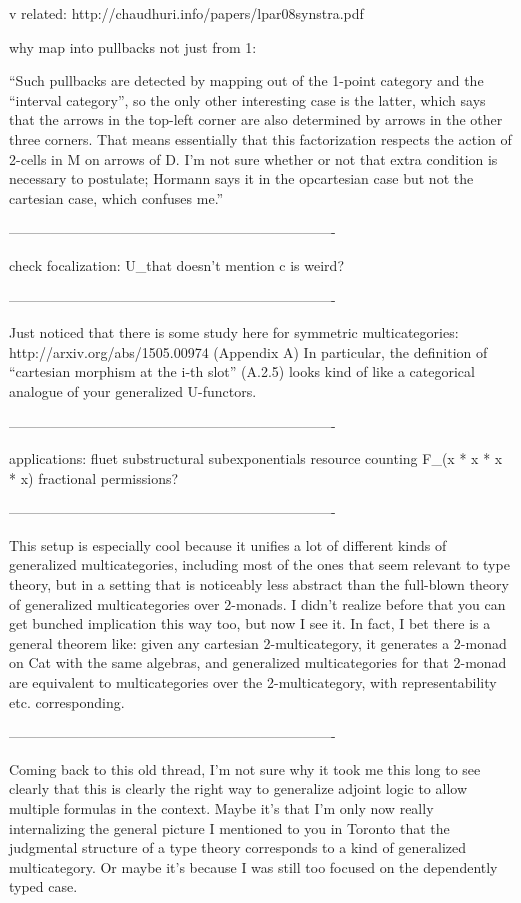 
v related: http://chaudhuri.info/papers/lpar08synstra.pdf

why map into pullbacks not just from 1:

``Such pullbacks are detected by mapping out of the 1-point category and
the ``interval category'', so the only other interesting case is the
latter, which says that the arrows in the top-left corner are also
determined by arrows in the other three corners.  That means essentially
that this factorization respects the action of 2-cells in M on arrows of
D.  I'm not sure whether or not that extra condition is necessary to
postulate; Hormann says it in the opcartesian case but not the cartesian
case, which confuses me.''

----------------------------------------------------------------------

check focalization: U_\alpha that doesn't mention c is weird?

----------------------------------------------------------------------

Just noticed that there is some study here for symmetric
multicategories: http://arxiv.org/abs/1505.00974 (Appendix A) In
particular, the definition of ``cartesian morphism at the i-th slot''
(A.2.5) looks kind of like a categorical analogue of your generalized
U-functors.

----------------------------------------------------------------------

applications:
fluet substructural
subexponentials
resource counting F_(x * x * x * x)
fractional permissions?

----------------------------------------------------------------------

This setup is especially cool because it unifies a lot of different
kinds of generalized multicategories, including most of the ones that
seem relevant to type theory, but in a setting that is noticeably less
abstract than the full-blown theory of generalized multicategories
over 2-monads.  I didn't realize before that you can get bunched
implication this way too, but now I see it.  In fact, I bet there is a
general theorem like: given any cartesian 2-multicategory, it
generates a 2-monad on Cat with the same algebras, and generalized
multicategories for that 2-monad are equivalent to multicategories
over the 2-multicategory, with representability etc. corresponding.

----------------------------------------------------------------------

Coming back to this old thread, I'm not sure why it took me this long to
see clearly that this is clearly the right way to generalize adjoint
logic to allow multiple formulas in the context.  Maybe it's that I'm
only now really internalizing the general picture I mentioned to you in
Toronto that the judgmental structure of a type theory corresponds to a
kind of generalized multicategory.  Or maybe it's because I was still
too focused on the dependently typed case.


